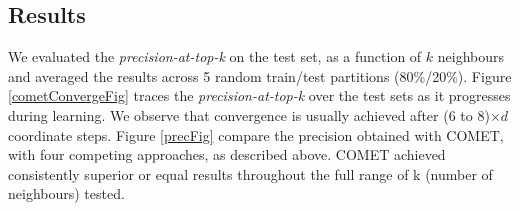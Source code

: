 \documentclass{article}
\begin{document}
\subsection{Results}
 We evaluated the \textit{precision-at-top-k} on the test set, as a function of $k$ neighbours and averaged the results across 5 random train/test partitions (80\%/20\%).
Figure \ref{cometConvergeFig} traces the \textit{precision-at-top-k} over the test sets as it progresses during learning. We observe that convergence is usually achieved after (6 to 8)$\times d$ coordinate steps.
Figure \ref{precFig} compare the precision obtained with COMET, with four competing approaches, as described above. COMET achieved consistently superior or equal results throughout the full range of k (number of neighbours) tested. 


\end{document}
